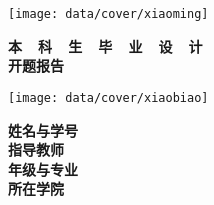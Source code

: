 \thispagestyle{empty}

{
\setlength{\parindent}{0em}
\renewcommand{\baselinestretch}{2}

\vspace*{-7mm}

\begin{center}
  \texttt{[image: data/cover/xiaoming]}
\end{center}

\vspace{-1mm}

{
\renewcommand{\baselinestretch}{1.8}
\heiti\erhao\bfseries
\centering
本~~科~~生~~毕~~业~~设~~计 \\
开题报告 \par
}

\vspace{4em}

\begin{center}
  \texttt{[image: data/cover/xiaobiao]}
\end{center}

\vspace{3em}

{
	\renewcommand{\baselinestretch}{1.65}
	\sanhao
	\centering
	{\kaiti\bfseries 姓名与学号} \; \underline{\makebox[13em]{\songti\zjuauthornamec~~\zjuauthorid}} \\ \vspace{0.9em}
	{\kaiti\bfseries 指导教师} \; \underline{\makebox[14em]{\songti\zjumentorc}} \\ \vspace{0.9em}
	{\kaiti\bfseries 年级与专业} \; \underline{\makebox[13em]{\songti\zjugrade~~\zjumajor}} \\ \vspace{0.9em}
	{\kaiti\bfseries 所在学院} \; \underline{\makebox[14em]{\songti\zjucollegec}} \par
}
}

